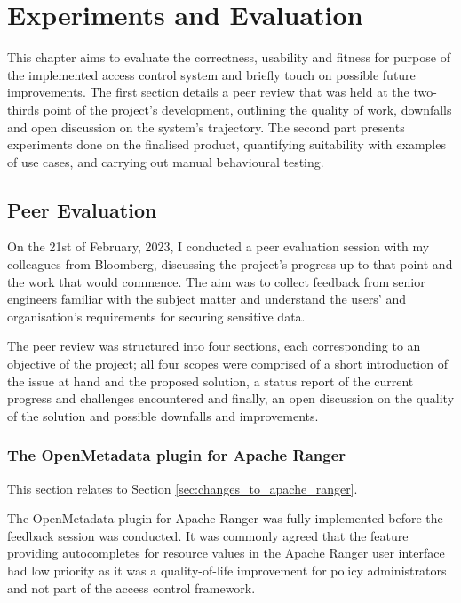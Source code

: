 \chapter{\label{cha:exp} Experiments and Evaluation}

This chapter aims to evaluate the correctness, usability and fitness for purpose of the implemented access control system and briefly touch on possible future improvements. The first section details a peer review that was held at the two-thirds point of the project's development, outlining the quality of work, downfalls and open discussion on the system's trajectory. The second part presents experiments done on the finalised product, quantifying suitability with examples of use cases, and carrying out manual behavioural testing.

\section{Peer Evaluation}

On the 21st of February, 2023, I conducted a peer evaluation session with my colleagues from Bloomberg, discussing the project's progress up to that point and the work that would commence. The aim was to collect feedback from senior engineers familiar with the subject matter and understand the users' and organisation's requirements for securing sensitive data.

The peer review was structured into four sections, each corresponding to an objective of the project; all four scopes were comprised of a short introduction of the issue at hand and the proposed solution, a status report of the current progress and challenges encountered and finally, an open discussion on the quality of the solution and possible downfalls and improvements. 

\subsection{The OpenMetadata plugin for Apache Ranger}

This section relates to Section \ref{sec:changes_to_apache_ranger}.

The OpenMetadata plugin for Apache Ranger was fully implemented before the feedback session was conducted. It was commonly agreed that the feature providing autocompletes for resource values in the Apache Ranger user interface had low priority as it was a quality-of-life improvement for policy administrators and not part of the access control framework.

